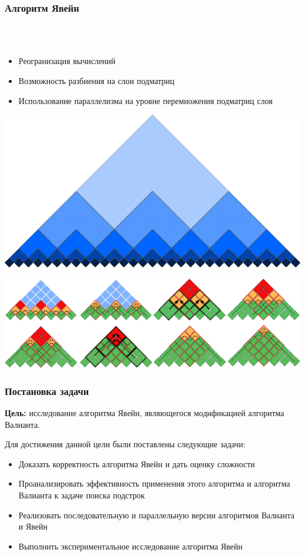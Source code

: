 \documentclass{beamer}
\begin{document}
\begin{frame}[fragile]
  \transwipe[direction=90]
  \frametitle{Алгоритм Явейн}
    \\~
    \begin{itemize}
    \item Реогранизация вычислений
    \item Возможность разбиения на слои \linebreak подматриц
    \item Использование параллелизма на \linebreak уровне перемножения подматриц \linebreak слоя
    \end{itemize}
        \begin{center}
        \vskip-90pt \hskip190pt
        \includegraphics[width=.38\textwidth]{pictures/layers.pdf}
        \end{center} 

        \begin{center}
        \vskip5pt
        \includegraphics[width=.90\textwidth]{pictures/modivis_again.pdf} 
        \end{center} 
\end{frame}

\begin{frame}
\frametitle{Постановка задачи}
\textbf{Цель:} исследование алгоритма Явейн, являющегося модификацией алгоритма Валианта.
    
\vspace{5\onelineskip}
    
Для достижения данной цели были поставлены следующие задачи:
\begin{itemize}
	\item Доказать корректность алгоритма Явейн и дать оценку сложности
	\item Проанализировать эффективность применения этого алгоритма и алгоритма Валианта к задаче поиска подстрок
	\item Реализовать последовательную и параллельную версии алгоритмов Валианта и Явейн
	\item Выполнить экспериментальное исследование алгоритма Явейн
\end{itemize}
\end{frame}
\end{document}
